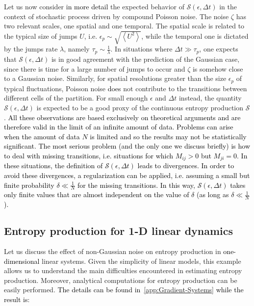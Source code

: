 \documentclass[12pt]{iopart}
\newcommand{\lx} {\left}
\newcommand{\rx} {\right}
\newcommand{\eps} {\epsilon}
\newcommand{\ave}[1] {\lx\langle #1 \rx\rangle}
\newcommand{\cS} {\mathcal{S}}
\begin{document}
Let us now consider \textcolor{black}{in more detail} the expected behavior of $\cS(\epsilon,\Delta t)$ in the context of stochastic process driven by compound Poisson noise. The noise $\zeta$ has two relevant scales, one spatial and one temporal. The spatial scale is related to the typical size of jumps $U$, i.e. $\epsilon_{p}\sim\sqrt{\ave{U^2}}$, while the temporal one is dictated by the jumps rate $\lambda$, namely $\tau_p\sim\frac{1}{\lambda}$. In situations where $\Delta t \gg \tau_p$, one expects that $\cS(\epsilon,\Delta t)$ is in good agreement with the prediction of the Gaussian case, since there is time for a large number of jumps to occur and $\zeta$ is somehow close to a Gaussian noise. Similarly, for spatial resolutions greater than the size $\epsilon_p$ of typical fluctuations, Poisson noise \textcolor{black}{does} not contribute to the transitions between different cells of the partition. For small enough $\epsilon$ and $\Delta t$ instead, the quantity $\cS(\epsilon,\Delta t)$ is expected to be a good proxy of the continuous entropy production $\cS$. \textcolor{black}{All these observations are based exclusively on theoretical arguments and are therefore valid in the limit of an infinite amount of data. Problems can arise when the amount of data $N$ is limited \textcolor{black}{and so the results may not be statistically significant.} The most serious problem (and the only one we discuss briefly) is how to deal with missing transitions, i.e. situations for which $M_{ij}>0 $ but $M_{ji}=0$. In these situations, the definition of $\cS(\eps,\Delta t)$ leads to divergences. In order to avoid these divergences, a regularization can be applied, i.e. assuming a small but finite probability $\delta\ll\frac{1}{N}$ for the missing transitions. In this way, $\cS(\eps,\Delta t)$ takes only finite values that are almost independent on the value of $\delta$ (as long as $\delta\ll\frac{1}{N}$).}


\subsection{Entropy production for 1-D linear dynamics}\label{sec:epr_linear_1d}
Let us discuss the effect of non-Gaussian noise on entropy production in \textcolor{black}{one-dimensional} linear systems. Given the simplicity of linear models, this example allows us to understand the main difficulties encountered in estimating entropy production. 
Moreover, analytical computations for entropy production can be easily performed. \textcolor{black}{The details can be found in~\ref{app:Gradient-Systems} while the result is}:
\end{document}
